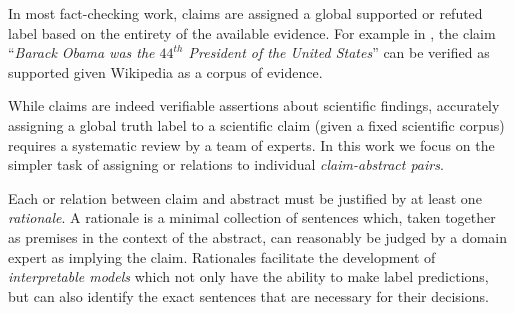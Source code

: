 \vspace{.2cm}
 \label{sec:evidence}
In most fact-checking work, claims are assigned a global supported or refuted label based on the entirety of the available evidence. For example in \fever, the claim ``\emph{Barack Obama was the $44^{th}$ President of the United States}'' can be verified as supported given Wikipedia as a corpus of evidence.

While \ours claims are indeed verifiable assertions about scientific findings, accurately assigning a global truth label to a scientific claim (given a fixed scientific corpus) requires a systematic review by a team of experts. In this work we focus on the simpler task of assigning \supports or  relations to individual \emph{claim-abstract pairs}.

Each \supports or  relation between claim and abstract must be justified by at least one \emph{rationale}. A rationale is a minimal collection of sentences which, taken together as premises in the context of the abstract, can reasonably be judged by a domain expert as implying the claim. Rationales facilitate the development of \emph{interpretable models} which not only have the ability to make label predictions, but can also identify the exact sentences that are necessary for their decisions.





